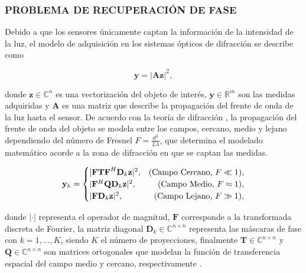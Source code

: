 \subsubsection{PROBLEMA DE RECUPERACIÓN DE FASE}

Debido a que los sensores únicamente captan la información de la intensidad de la luz, el modelo de adquisición en los sistemas ópticos de difracción se describe como

\begin{equation}
    \mathbf{y} = \vert \mathbf{A}\mathbf{z} \vert^2, 
    \label{eq:phase_retrieval_problem}
\end{equation}

donde $\mathbf{z} \in {\mathbb{C}}^{n}$ es una vectorización del objeto de interés, $\mathbf{y} \in \mathbb{R}^{m}$ son las medidas adquiridas y $\mathbf{A}$ es una matriz que describe la propagación del frente de onda de la luz hasta el sensor. De acuerdo con la teoría de difracción \cite{poon2014introduction}, la propagación del frente de onda del objeto se modela entre los campos, cercano, medio y lejano dependiendo del número de Fresnel $F = \frac{d^2}{L\lambda}$, que determina el modelado matemático acorde a la zona de difracción en que se captan las medidas.

\begin{align}
    \mathbf{y}_k= 
         \begin{cases}
            \vert \mathbf{FTF}^{H}\mathbf{D}_k\mathbf{z} \vert^2, & \hfill (\text{Campo Cercano, }F \ll 1) \nonumber, \\ 
            \vert \mathbf{F}^{H}\mathbf{Q}\mathbf{D}_k\mathbf{z} \vert^2,  & \hfill (\text{Campo Medio, }F \approx 1), \\
            \vert \mathbf{F}\mathbf{D}_k\mathbf{z} \vert^2,  & \hfill (\text{Campo Lejano, } F \gg 1),   \nonumber
         \end{cases}
    \label{eq:modelado_zonas_difraccion}
\end{align}

donde $\vert \cdot \vert$ representa el operador de magnitud, $\mathbf{F}$ corresponde a la transformada discreta de Fourier, la matriz diagonal $\mathbf{D}_k \in \mathbb{C}^{n \times n}$ representa las máscaras de fase con $k=1,\dots,K$, siendo $K$ el número de proyecciones, finalmente $\mathbf{T} \in \mathbb{C}^{n \times n}$ y $\mathbf{Q} \in \mathbb{C}^{n \times n}$ son matrices ortogonales que modelan la función de transferencia espacial del campo medio y cercano, respectivamente \cite{poon2014introduction,goodman2005introduction}.

